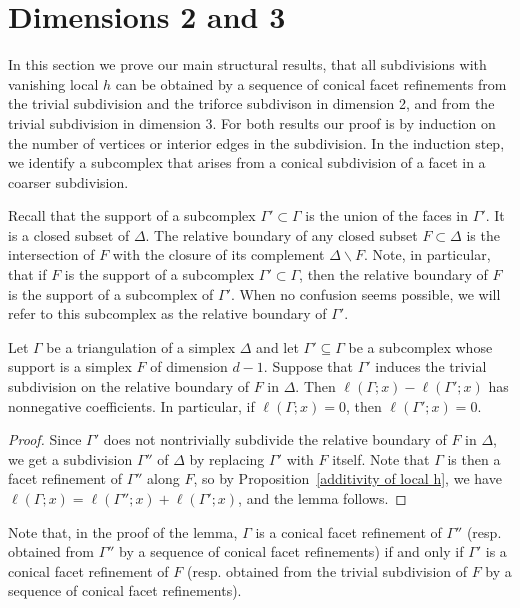 \documentclass[ALCO,ThmDefs,Unicode,epreuves]{cedram}
\begin{document}
\section{Dimensions 2 and 3} \label{sec:dim23}

In this section we prove our main structural results, that all subdivisions with vanishing local $h$ can be obtained by a sequence of conical facet refinements from the trivial subdivision and the triforce subdivison in dimension 2, and from the trivial subdivision in dimension 3. For both results our proof is by induction on the number of vertices or interior edges in the subdivision. In the induction step, we identify a subcomplex that arises from a conical subdivision of a facet in a coarser subdivision.


Recall that the support of a subcomplex $\Gamma' \subset \Gamma$ is the union of the faces in $\Gamma'$. It is a closed subset of $\Delta$.
The relative boundary of any closed subset $F \subset \Delta$ is the intersection of $F$ with the closure of its complement $\Delta \smallsetminus F$. Note, in particular, that if $F$ is the support of a subcomplex $\Gamma' \subset \Gamma$, then the relative boundary of $F$ is the support of a subcomplex of $\Gamma'$. When no confusion seems possible, we will refer to this subcomplex as the relative boundary of $\Gamma'$.

\begin{lemma}\label{coarsening-condition}
Let $\Gamma$ be a triangulation of a simplex $\Delta$ and let $\Gamma'\subseteq \Gamma$ be a subcomplex whose support is a simplex $F$ of dimension $d-1$. Suppose that $\Gamma'$ induces the trivial subdivision on the relative boundary of $F$ in $\Delta$.
Then $\ell(\Gamma; x) - \ell(\Gamma'; x)$ has nonnegative coefficients. 
In particular, if $\ell(\Gamma;x)=0$, then $\ell(\Gamma';x)=0$. 
\end{lemma}

\begin{proof}
Since $\Gamma'$ does not nontrivially subdivide the relative boundary of $F$ in $\Delta$, we get a subdivision $\Gamma''$ of $\Delta$ by replacing $\Gamma'$ with $F$ itself. Note that $\Gamma$ is then a facet refinement of $\Gamma''$ along $F$, so by Proposition~\ref{additivity of local h},
we have $\ell(\Gamma;x)=\ell(\Gamma'';x)+\ell(\Gamma';x)$, and the lemma follows.
\end{proof}

\begin{rema}
Note that, in the proof of the lemma, $\Gamma$ is a conical facet refinement of $\Gamma''$ (resp. obtained from $\Gamma''$ by a sequence of conical facet refinements) if and only if $\Gamma'$ is a conical facet refinement of $F$ (resp. obtained from the trivial subdivision of $F$ by a sequence of conical facet refinements).
\end{rema}
\end{document}
